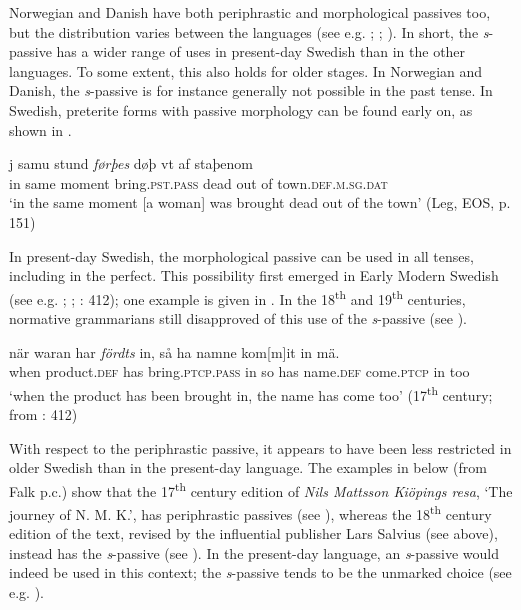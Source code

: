 \documentclass[output=paper]{langscibook}
\begin{document}
Norwegian and Danish have both periphrastic and morphological passives too, but the distribution varies between the languages (see e.g. \citealt{Engdahl2006}; \citealt{Laanemets2012}; \citealt{Faarlund2019}). In short, the \textit{s}{}-passive has a wider range of uses in present-day Swedish than in the other languages. To some extent, this also holds for older stages. In Norwegian and Danish, the \textit{s}{}-passive is for instance generally not possible in the past tense. In Swedish, preterite forms with passive morphology can be found early on, as shown in .


\ea\label{ex:intro:30}
\gll j     samu   stund \textit{førþes} døþ     vt     af staþenom\\
in   same     moment bring\textsc{.pst.pass}   dead     out   of town.\textsc{def.m.sg.dat}\\
\glt ‘in the same moment [a woman] was brought dead out of the town’ (Leg, EOS, p. 151)
\z


In present-day Swedish, the morphological passive can be used in all tenses, including in the perfect. This possibility first emerged in Early Modern Swedish (see e.g. \citealt{Holm1952}; \citealt{Platzack1989}; \citealt{Larsson2009}: 412); one example is given in . In the 18\textsuperscript{th} and 19\textsuperscript{th} centuries, normative grammarians still disapproved of this use of the \textit{s}{}-passive (see \citealt{Platzack1989}).


\ea\label{ex:intro:31}
\gll när     waran       har \textit{fördts} in, så ha   namne      kom[m]it in mä.\\
  when product\textsc{.def}  has bring.\textsc{ptcp.pass}     in  so has name\textsc{.def} come\textsc{.ptcp} in too\\
\glt ‘when the product has been brought in, the name has come too’ (17\textsuperscript{th} century; from \citealt{Larsson2009}: 412)
\z


With respect to the periphrastic passive, it appears to have been less restricted in older Swedish than in the present-day language. The examples in  below (from Falk p.c.) show that the 17\textsuperscript{th} century edition of \textit{Nils Mattsson Kiöpings resa}, ‘The journey of N. M. K.’, has periphrastic passives (see ), whereas the 18\textsuperscript{th} century edition of the text, revised by the influential publisher Lars Salvius (see  above), instead has the \textit{s}{}-passive (see ). In the present-day language, an \textit{s}{}-passive would indeed be used in this context; the \textit{s}{}-passive tends to be the unmarked choice (see e.g. \citealt{Engdahl2006}).
\end{document}
